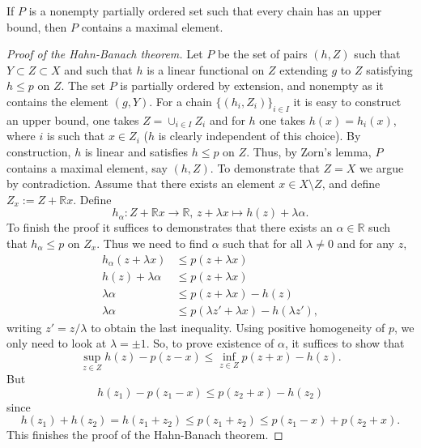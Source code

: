 \begin{theorem}
  If $P$ is a nonempty partially ordered set such that every chain has an upper bound,
  then $P$ contains a maximal element.
\end{theorem}

\begin{proof}[Proof of the Hahn-Banach theorem]
  Let $P$ be the set of pairs $(h,Z)$ such that $Y\subset Z\subset X$
  and such that $h$ is a linear functional on $Z$ extending $g$ to $Z$ satisfying $h\leq p$ on $Z$.
  The set $P$ is partially ordered by extension, and nonempty as it contains
  the element $(g,Y)$.
  For a chain $\{(h_i,Z_i)\}_{i\in I}$ it is easy to construct an upper bound,
  one takes $Z=\cup_{i\in I}Z_i$ and for $h$ one takes
  $h(x)=h_i(x)$, where $i$ is such that $x\in Z_i$ ($h$ is clearly independent of this choice).
  By construction, $h$ is linear and satisfies $h\leq p$ on $Z$.
  Thus, by Zorn's lemma, $P$ contains a maximal element, say $(h,Z)$.
  To demonstrate that $Z=X$ we argue by contradiction.
  Assume that there exists an element $x\in X\setminus Z$, and define $Z_x:=Z+\mathbb{R}x$.
  Define $$h_\alpha:Z+\mathbb{R}x\to\mathbb{R},\,z+\lambda x\mapsto h(z)+\lambda\alpha.$$
  To finish the proof it suffices to demonstrates that there exists an $\alpha\in\mathbb{R}$
  such that $h_\alpha\leq p$ on $Z_x$.
  Thus we need to find $\alpha$ such that for all $\lambda\neq0$ and for any $z$,
  \begin{align*}
    h_\alpha(z+\lambda x)&\leq  p(z+\lambda x)\\
    h(z)+\lambda\alpha&\leq p(z+\lambda x)\\
    \lambda\alpha&\leq p(z+\lambda x)-h(z)\\
    \lambda\alpha&\leq p(\lambda z'+\lambda x)-h(\lambda z'),
  \end{align*}
  writing $z'=z/\lambda$ to obtain the last inequality.
  Using positive homogeneity of $p$, we only need to look at $\lambda=\pm 1$.
  So, to prove existence of $\alpha$, it suffices to show that
  $$\sup_{z\in Z} h(z)-p(z-x) \leq \inf_{z\in Z} p(z+x)-h(z).$$
  But
  $$h(z_1)-p(z_1-x)\leq p(z_2+x)-h(z_2)$$
  since
  $$h(z_1)+h(z_2)=h(z_1+z_2)\leq p(z_1+z_2)\leq p(z_1-x)+p(z_2+x).$$
  This finishes the proof of the Hahn-Banach theorem.
\end{proof}
